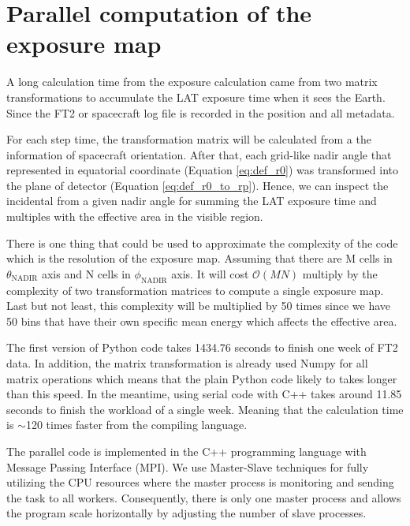 \chapter{Parallel computation of the exposure map}
\label{appendix:exposure}

A long calculation time from the exposure calculation came from 
two matrix transformations to accumulate the LAT exposure time 
when it sees the Earth. Since the FT2 or spacecraft log file is
recorded in the position and all metadata.

For each step time, 
the transformation matrix will be calculated from a the 
information of spacecraft orientation.
After that, each grid-like nadir angle 
that represented in equatorial coordinate (Equation \ref{eq:def_r0})
was transformed into the plane of detector (Equation \ref{eq:def_r0_to_rp}).
Hence, we can inspect the incidental from a given nadir angle
for summing the LAT exposure time and multiples with 
the effective area in the visible region.

There is one thing that could be used to approximate the 
complexity of the code which is the resolution of the exposure map.
Assuming that there are M cells in $\theta_\text{NADIR}$ axis
and N cells in $\phi_\text{NADIR}$ axis. It will cost 
$\mathcal{O}(MN)$ multiply by the complexity of two 
transformation matrices to compute a single exposure map.
Last but not least, this complexity will be multiplied by 50 times 
since we have 50 bins that have their own specific mean energy 
which affects the effective area.


The first version of Python code takes 1434.76 seconds to finish 
one week of FT2 data.
In addition, the matrix transformation is already used Numpy 
for all matrix operations which means that the plain Python code 
likely to takes longer than this speed. In the meantime, using 
serial code with C++ takes around 11.85 seconds to finish 
the workload of a single week. Meaning that the calculation time 
is $\sim$120 times faster from the compiling language.

The parallel code is implemented in the C++ programming language 
with Message Passing Interface (MPI). We use Master-Slave techniques
for fully utilizing the CPU resources where the master process 
is monitoring and sending the task to all workers. Consequently,
there is only one master process and allows the program scale 
horizontally by adjusting the number of slave processes. 

